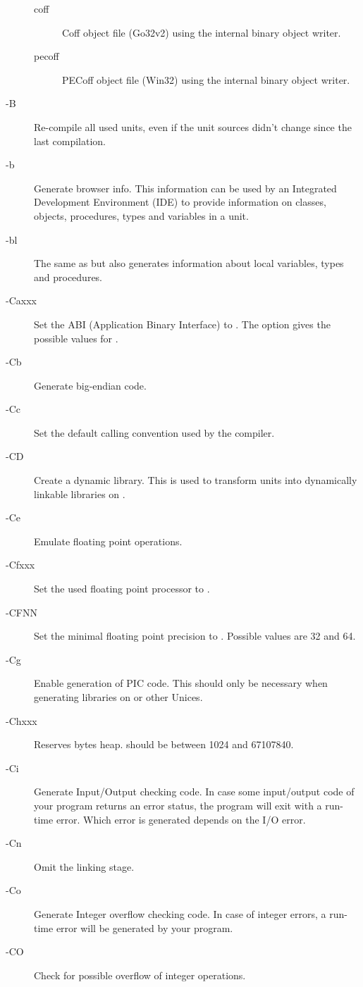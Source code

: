\begin{description}
\begin{description}
\item[coff] Coff object file (Go32v2) using the internal binary object writer.
\item[pecoff] PECoff object file (Win32) using the internal binary object writer.
\end{description}
\item[-B]  Re-compile all used units, even
if the unit sources didn't change since the last compilation.
\item[-b]  Generate browser info. This information can
be used by an Integrated Development Environment (IDE) to provide information
on classes, objects, procedures, types  and variables in a unit.
\item[-bl]  The same as  but also generates
information about local variables, types and procedures.
\item[-Caxxx] Set the ABI (Application Binary Interface) to . 
The  option gives the possible values  for .
\item[-Cb] Generate big-endian code.
\item[-Cc] Set the default calling convention used by the compiler.
\item [-CD] Create a dynamic library. This is used to transform units into
dynamically linkable libraries on \linux.
\item[-Ce] Emulate floating point operations.
\item[-Cfxxx] Set the used floating point processor to .
\item[-CFNN] Set the minimal floating point precision to . Possible
values are 32 and 64.
\item[-Cg] Enable generation of PIC code. This should only be necessary when
generating libraries on \linux or other Unices.
\item [-Chxxx]  Reserves  bytes heap.  should
be between 1024 and 67107840.
\item [-Ci]  Generate Input/Output checking code. In case some
input/output code of your program returns an error status, the program will
exit with a run-time error. Which error is generated depends on the I/O error.
\item [-Cn]  Omit the linking stage.
\item [-Co]  Generate Integer overflow checking code. In case of
integer errors, a run-time error will be generated by your program.
\item [-CO]  Check for possible overflow of integer operations.

\end{description}
